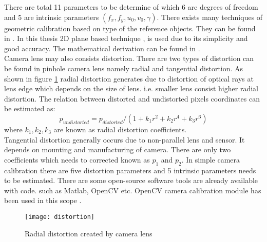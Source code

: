 There are total 11 parameters to be determine of which 6 are degrees of freedom and 5 are intrinsic parameters $ (f_{x},f_{y},u_{0},v_{0}, \gamma) $. There exists many techniques of geometric calibration based on type of the reference objects. They can be found in \cite{cameracalib}. In this thesis 2D plane based technique \cite{zhangcalib}, \cite{sturmcalib} is used due to its simplicity and good accuracy. The mathematical derivation can be found in \cite{cameracalib}.\\
\newline
Camera lens may also consists distortion. There are two types of distortion can be found in pinhole camera lens namely radial and tangential distortion. As shown in figure \ref{fig:distortion} radial distortion generates due to distortion of optical rays at lens edge which depends on the size of lens. i.e. smaller lens consist higher radial distortion. The relation between distorted and undistorted pixels coordinates can be estimated as:
\begin{equation*}
p_{undistorted} = p_{distorted} /(1+ k_{1}r^{2}+k_{2}r^{4}+k_{3}r^{6})
\end{equation*} 
where $ k_{1},k_{2},k_{3} $ are known as radial distortion coefficients.\\
\newline
Tangential distortion generally occurs due to non-parallel lens and sensor. It depends on mounting and manufacturing of camera. There are only two coefficients which needs to corrected known as $p_{1} $ and $ p_{2} $. In simple camera calibration there are five distortion parameters and 5 intrinsic parameters needs to be estimated. There are some open-source software tools are already available with code. such as Matlab, OpenCV etc. OpenCV camera calibration module has been used in this scope \cite{opencvcalib}. 
\begin{figure}[h!]
	\centering
	\texttt{[image: distortion]}
	\caption{Radial distortion created by camera lens \cite{opencvcalib}}
	\label{fig:distortion}
\end{figure}

